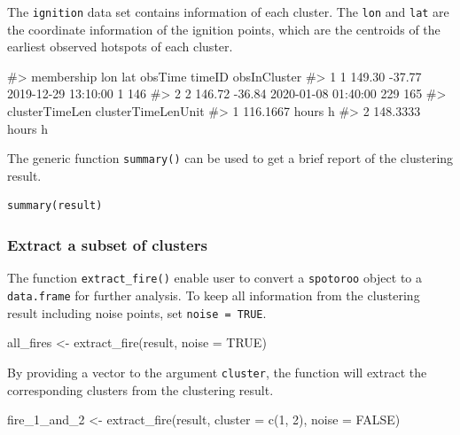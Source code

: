 The \texttt{ignition} data set contains information of each cluster. The
\texttt{lon} and \texttt{lat} are the coordinate information of the
ignition points, which are the centroids of the earliest observed
hotspots of each cluster.

\begin{Schunk}
\begin{Soutput}
#>   membership    lon    lat             obsTime timeID obsInCluster
#> 1          1 149.30 -37.77 2019-12-29 13:10:00      1          146
#> 2          2 146.72 -36.84 2020-01-08 01:40:00    229          165
#>   clusterTimeLen clusterTimeLenUnit
#> 1 116.1667 hours                  h
#> 2 148.3333 hours                  h
\end{Soutput}
\end{Schunk}

The generic function \texttt{summary()} can be used to get a brief
report of the clustering result.

\begin{verbatim}
summary(result)
\end{verbatim}

\hypertarget{extract-a-subset-of-clusters}{%
\subsubsection{Extract a subset of
clusters}\label{extract-a-subset-of-clusters}}

The function \texttt{extract\_fire()} enable user to convert a
\texttt{spotoroo} object to a \texttt{data.frame} for further analysis.
To keep all information from the clustering result including noise
points, set \texttt{noise\ =\ TRUE}.

\begin{Schunk}
\begin{Sinput}
all_fires <- extract_fire(result, noise = TRUE)
\end{Sinput}
\end{Schunk}

By providing a vector to the argument \texttt{cluster}, the function
will extract the corresponding clusters from the clustering result.

\begin{Schunk}
\begin{Sinput}
fire_1_and_2 <- extract_fire(result, cluster = c(1, 2), noise = FALSE)
\end{Sinput}
\end{Schunk}

